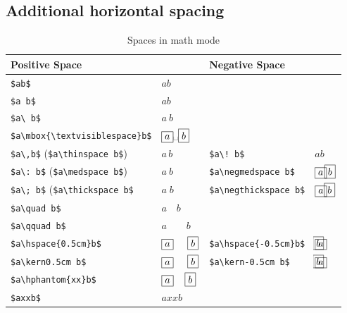 \begin{table}[htb]
\subsection{Additional horizontal spacing}

\begin{table}[!htb]
\def\arraystretch{1.2}
\centering
\begin{tabular}{ll|ll}
\multicolumn{2}{l|}{Positive Space}&\multicolumn{2}{l}{Negative Space}\\\hline
\verb|$ab$|   & $\boxed{a}\boxed{b}$\\
\verb|$a b$|  & $\boxed{a} \boxed{b}$\\
\verb|$a\ b$| & $\boxed{a}\ \boxed{b}$\\
\verb|$a\mbox{\textvisiblespace}b$| & $\boxed{a}\mbox{\textvisiblespace}\boxed{b}$\\
\verb|$a\,b$|\index{,@\textbackslash ,} (\verb|$a\thinspace b$|)\index{thinspace@\textbackslash thinspace} & $\boxed{a}\,\boxed{b}$&
\verb|$a\! b$|\index{negthinspace@\textbackslash negthinspace} & $\boxed{a}\!\boxed{b}$\\
\verb|$a\: b$|\index{:@\textbackslash :} (\verb|$a\medspace b$|)\index{medspace@\textbackslash medspace}&
$\boxed{a}\:\boxed{b}$&
\verb|$a\negmedspace b$|\index{negmedspace@\textbackslash negmedspace} & $\boxed{a}\negmedspace\boxed{b}$\\
\verb|$a\; b$|\index{;@\textbackslash ;} (\verb|$a\thickspace b$|\index{thickspace@\textbackslash thickspace}&
$\boxed{a}\;\boxed{b}$&
\verb|$a\negthickspace b$|\index{negthickspace@\textbackslash negthickspace}&
$\boxed{a}\negthickspace\boxed{b}$\\
\verb|$a\quad b$|\index{quad@\textbackslash quad} & $\boxed{a}\quad\boxed{b}$\\
\verb|$a\qquad b$|\index{qquad@\textbackslash qquad} & $\boxed{a}\qquad\boxed{b}$\\
\verb|$a\hspace{0.5cm}b$|\index{hspace@\textbackslash hspace}& $\boxed{a}\hspace{0.5cm}\boxed{b}$&
\verb|$a\hspace{-0.5cm}b$| & $\boxed{a}\hspace{-0.5cm}\boxed{b}$\\
\verb|$a\kern0.5cm b$|\index{kern@\textbackslash kern} & $\boxed{a}\kern0.5cm \boxed{b}$ & \verb|$a\kern-0.5cm b$| & $\boxed{a}\kern-0.5cm \boxed{b}$\\
\verb|$a\hphantom{xx}b$|\index{hphantom@\textbackslash hphantom} & $\boxed{a}\hphantom{xx}\boxed{b}$\\
\verb|$axxb$| & $\boxed{a}xx\boxed{b}$
\end{tabular}
\caption{Spaces in math mode}\label{cap:Spaces-in-math mode}
\end{table}


\end{table}

